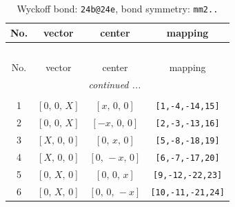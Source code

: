 \documentclass[fleqn,8pt]{jsarticle}
\begin{document}
\begin{longtable}{cccc}
\caption{Wyckoff bond: {\tt 24b@24e}, bond symmetry: {\tt mm2..}}
 \\
 \hline \hline
No. & vector & center & mapping \\ \hline \endfirsthead

\multicolumn{3}{l}{\tablename\ \thetable{}} \\
 \hline \hline
No. & vector & center & mapping \\ \hline \endhead

 \hline \hline
\multicolumn{3}{r}{\footnotesize\it continued ...} \\ \endfoot

 \hline \hline
\multicolumn{3}{r}{} \\ \endlastfoot

1 & $\left[ 0,\, 0,\, X \right]$ & $\left[ x,\, 0,\, 0 \right]$ & {\tt [1,-4,-14,15]} \\ \hline
2 & $\left[ 0,\, 0,\, X \right]$ & $\left[ - x,\, 0,\, 0 \right]$ & {\tt [2,-3,-13,16]} \\ \hline
3 & $\left[ X,\, 0,\, 0 \right]$ & $\left[ 0,\, x,\, 0 \right]$ & {\tt [5,-8,-18,19]} \\ \hline
4 & $\left[ X,\, 0,\, 0 \right]$ & $\left[ 0,\, - x,\, 0 \right]$ & {\tt [6,-7,-17,20]} \\ \hline
5 & $\left[ 0,\, X,\, 0 \right]$ & $\left[ 0,\, 0,\, x \right]$ & {\tt [9,-12,-22,23]} \\ \hline
6 & $\left[ 0,\, X,\, 0 \right]$ & $\left[ 0,\, 0,\, - x \right]$ & {\tt [10,-11,-21,24]} \\
\end{longtable}
\renewcommand{\arraystretch}{1.2}
\end{document}
